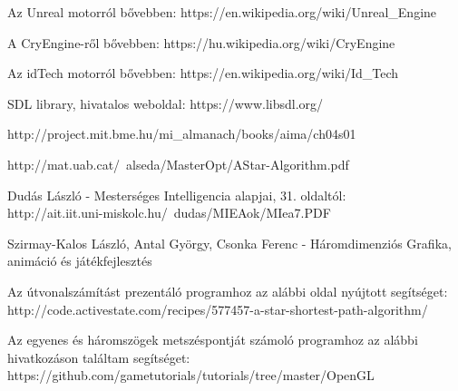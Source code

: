 \begin{thebibliography}{x}

Az Unreal motorról bővebben: https://en.wikipedia.org/wiki/Unreal\_Engine

A CryEngine-ről bővebben: https://hu.wikipedia.org/wiki/CryEngine

Az idTech motorról bővebben: https://en.wikipedia.org/wiki/Id\_Tech

SDL library, hivatalos weboldal: https://www.libsdl.org/

http://project.mit.bme.hu/mi\_almanach/books/aima/ch04s01

http://mat.uab.cat/~alseda/MasterOpt/AStar-Algorithm.pdf

Dudás László - Mesterséges Intelligencia alapjai, 31. oldaltól:\\http://ait.iit.uni-miskolc.hu/~dudas/MIEAok/MIea7.PDF

Szirmay-Kalos László, Antal György, Csonka Ferenc - Háromdimenziós Grafika, animáció és játékfejlesztés

Az útvonalszámítást prezentáló programhoz az alábbi oldal nyújtott segítséget: http://code.activestate.com/recipes/577457-a-star-shortest-path-algorithm/

Az egyenes és háromszögek metszéspontját számoló programhoz az alábbi hivatkozáson találtam segítséget:\\
https://github.com/gametutorials/tutorials/tree/master/OpenGL

\end{thebibliography}
